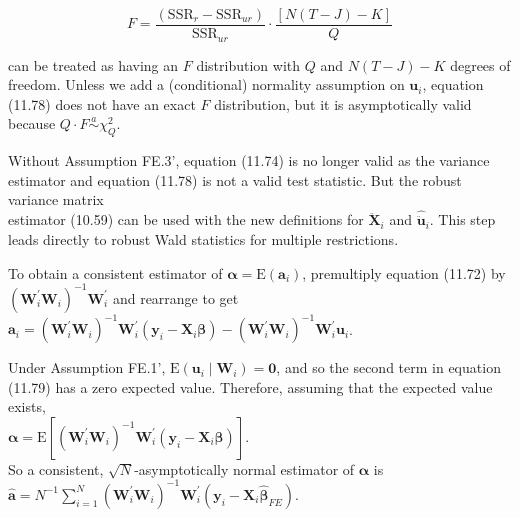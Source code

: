 \documentclass[10pt]{article}
\begin{document}
\begin{equation*}
F=\frac{\left(\mathrm{SSR}_{r}-\mathrm{SSR}_{u r}\right)}{\mathrm{SSR}_{u r}} \cdot \frac{[N(T-J)-K]}{Q} \tag{11.78}
\end{equation*}


can be treated as having an $F$ distribution with $Q$ and $N(T-J)-K$ degrees of freedom. Unless we add a (conditional) normality assumption on $\mathbf{u}_{i}$, equation (11.78) does not have an exact $F$ distribution, but it is asymptotically valid because $Q \cdot F \stackrel{a}{\sim} \chi_{Q}^{2}$.

Without Assumption FE.3', equation (11.74) is no longer valid as the variance estimator and equation (11.78) is not a valid test statistic. But the robust variance matrix\\
estimator (10.59) can be used with the new definitions for $\ddot{\mathbf{X}}_{i}$ and $\hat{\ddot{\mathbf{u}}}_{i}$. This step leads directly to robust Wald statistics for multiple restrictions.

To obtain a consistent estimator of $\boldsymbol{\alpha}=\mathrm{E}\left(\mathbf{a}_{i}\right)$, premultiply equation (11.72) by $\left(\mathbf{W}_{i}^{\prime} \mathbf{W}_{i}\right)^{-1} \mathbf{W}_{i}^{\prime}$ and rearrange to get\\
$\mathbf{a}_{i}=\left(\mathbf{W}_{i}^{\prime} \mathbf{W}_{i}\right)^{-1} \mathbf{W}_{i}^{\prime}\left(\mathbf{y}_{i}-\mathbf{X}_{i} \boldsymbol{\beta}\right)-\left(\mathbf{W}_{i}^{\prime} \mathbf{W}_{i}\right)^{-1} \mathbf{W}_{i}^{\prime} \mathbf{u}_{i}$.

Under Assumption FE.1', $\mathrm{E}\left(\mathbf{u}_{i} \mid \mathbf{W}_{i}\right)=\mathbf{0}$, and so the second term in equation (11.79) has a zero expected value. Therefore, assuming that the expected value exists,\\
$\boldsymbol{\alpha}=\mathrm{E}\left[\left(\mathbf{W}_{i}^{\prime} \mathbf{W}_{i}\right)^{-1} \mathbf{W}_{i}^{\prime}\left(\mathbf{y}_{i}-\mathbf{X}_{i} \boldsymbol{\beta}\right)\right]$.\\
So a consistent, $\sqrt{N}$-asymptotically normal estimator of $\boldsymbol{\alpha}$ is\\
$\hat{\boldsymbol{a}}=N^{-1} \sum_{i=1}^{N}\left(\mathbf{W}_{i}^{\prime} \mathbf{W}_{i}\right)^{-1} \mathbf{W}_{i}^{\prime}\left(\mathbf{y}_{i}-\mathbf{X}_{i} \hat{\boldsymbol{\beta}}_{F E}\right)$.
\end{document}
